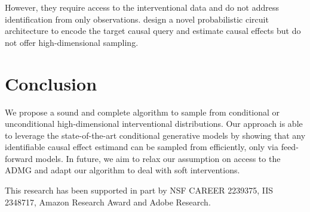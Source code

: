 \documentclass{article}
\newcommand{\red}{\textcolor{red}}
\newcommand{\idgen}{\text{ID-GEN}\xspace}
\theoremstyle{plain}
\theoremstyle{definition}
\theoremstyle{remark}
\begin{document}
However, they require access to the interventional data and do not address identification from only observations. \citet{wang2023compositional} design a novel probabilistic circuit architecture to encode the target causal query and estimate causal effects but do not offer high-dimensional sampling. 
%
\section{Conclusion}
We propose a sound and complete algorithm to sample from conditional or unconditional high-dimensional interventional distributions. Our approach is able to leverage the state-of-the-art conditional generative models by showing that any identifiable causal effect estimand can be sampled from efficiently, only via feed-forward  models. 
In future, we aim to relax our assumption on access to the ADMG and adapt our algorithm to deal with soft interventions.
%
%
%

\clearpage
\begin{ack}
This research has been supported in part by NSF CAREER 2239375, IIS 2348717, Amazon Research Award and Adobe Research.
\end{ack}
%
%
%


% 




\clearpage
\appendix
\end{document}
